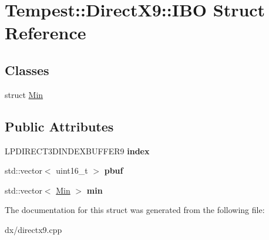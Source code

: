 \hypertarget{struct_direct_x9_1_1_i_b_o}{\section{Tempest\+:\+:Direct\+X9\+:\+:I\+B\+O Struct Reference}
\label{struct_direct_x9_1_1_i_b_o}
}
\subsection*{Classes}
\begin{DoxyCompactItemize}
\item 
struct \hyperlink{struct_direct_x9_1_1_i_b_o_1_1_min}{Min}
\end{DoxyCompactItemize}
\subsection*{Public Attributes}
\begin{DoxyCompactItemize}
\item 
\hypertarget{struct_direct_x9_1_1_i_b_o_a0c6ac00a8cdc16abb662de9868deb33e}{L\+P\+D\+I\+R\+E\+C\+T3\+D\+I\+N\+D\+E\+X\+B\+U\+F\+F\+E\+R9 {\bfseries index}}\label{struct_direct_x9_1_1_i_b_o_a0c6ac00a8cdc16abb662de9868deb33e}

\item 
\hypertarget{struct_direct_x9_1_1_i_b_o_a2993a38160e5efe253d8156577599b7c}{std\+::vector$<$ uint16\+\_\+t $>$ {\bfseries pbuf}}\label{struct_direct_x9_1_1_i_b_o_a2993a38160e5efe253d8156577599b7c}

\item 
\hypertarget{struct_direct_x9_1_1_i_b_o_aeaeb233b5290ea22cef8bf7bac259443}{std\+::vector$<$ \hyperlink{struct_direct_x9_1_1_i_b_o_1_1_min}{Min} $>$ {\bfseries min}}\label{struct_direct_x9_1_1_i_b_o_aeaeb233b5290ea22cef8bf7bac259443}

\end{DoxyCompactItemize}


The documentation for this struct was generated from the following file\+:\begin{DoxyCompactItemize}
\item 
dx/directx9.\+cpp\end{DoxyCompactItemize}
